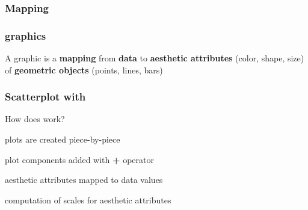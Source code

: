 \documentclass[12pt]{beamer}\usepackage[]{graphicx}\usepackage[]{color}
\begin{document}
\begin{frame}
\frametitle{Mapping}
\begin{center}
\end{center}
\end{frame}


\begin{frame}
\frametitle{ graphics}

A graphic is a {\hilit \textbf{mapping}} from \textbf{data} to \textbf{aesthetic attributes} (color, shape, size) of \textbf{geometric objects} (points, lines, bars)
\eb

\bi
  \item {}
  \item {}
  \item {}
\ei

\end{frame}


\begin{frame}[fragile]
\frametitle{Scatterplot with }

How does  work?
\bi
  \item plots are created piece-by-piece
  \item plot components added with {\hilit \textbf{+}} operator
  \item aesthetic attributes mapped to data values
  \item computation of scales for aesthetic attributes
\ei

\end{frame}

\end{document}
